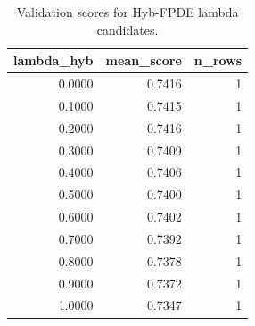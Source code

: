 \begin{table}[t]
\caption{Validation scores for Hyb-FPDE lambda candidates.}
\label{tab:lambda_distribution_computed}
\centering
\begin{tabular}{rrr}
\toprule
lambda\_hyb & mean\_score & n\_rows \\
\midrule
0.0000 & 0.7416 & 1 \\
0.1000 & 0.7415 & 1 \\
0.2000 & 0.7416 & 1 \\
0.3000 & 0.7409 & 1 \\
0.4000 & 0.7406 & 1 \\
0.5000 & 0.7400 & 1 \\
0.6000 & 0.7402 & 1 \\
0.7000 & 0.7392 & 1 \\
0.8000 & 0.7378 & 1 \\
0.9000 & 0.7372 & 1 \\
1.0000 & 0.7347 & 1 \\
\bottomrule
\end{tabular}

\end{table}
